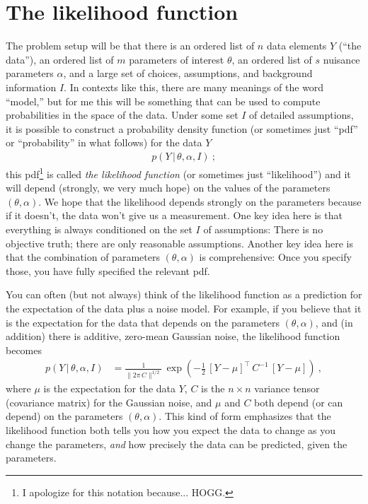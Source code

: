 \documentclass{article}
\newcommand{\given}{\,|\,}
\newcommand{\norm}[1]{\lVert{#1}\rVert}
\begin{document}
\section{The likelihood function}\label{sec:lf}
The problem setup will be that there is an ordered list of $n$ data elements $Y$ (``the data''), an ordered list of $m$ parameters of interest $\theta$, an ordered list of $s$ nuisance parameters $\alpha$, and a large set of choices, assumptions, and background information $I$.
In contexts like this, there are many meanings of the word ``model,'' but for me this will be something that can be used to compute probabilities in the space of the data.
Under some set $I$ of detailed assumptions, it is possible to construct a probability density function (or sometimes just ``pdf'' or ``probability'' in what follows) for the data $Y$
\begin{align}
    p(Y\given\theta,\alpha,I) ~;
\end{align}
this pdf\footnote{I apologize for this notation because... HOGG.} is called \emph{the likelihood function} (or sometimes just ``likelihood'') and it will depend (strongly, we very much hope) on the values of the parameters $(\theta, \alpha)$.
We hope that the likelihood depends strongly on the parameters because if it doesn't, the data won't give us a measurement.
One key idea here is that everything is always conditioned on the set $I$ of assumptions: There is no objective truth; there are only reasonable assumptions.
Another key idea here is that the combination of parameters $(\theta,\alpha)$ is comprehensive: Once you specify those, you have fully specified the relevant pdf.

You can often (but not always) think of the likelihood function as a prediction for the expectation of the data plus a noise model.
For example, if you believe that it is the expectation for the data that depends on the parameters $(\theta, \alpha)$, and (in addition) there is additive, zero-mean Gaussian noise, the likelihood function becomes
\begin{align}
    p(Y\given\theta,\alpha,I) &= \frac{1}{\norm{2\pi\,C}^{1/2}}\,\exp\left(-\frac{1}{2}\,[Y - \mu]^\top\,C^{-1}\,[Y - \mu]\right) ~,
\end{align}
where $\mu$ is the expectation for the data $Y$,
$C$ is the $n\times n$ variance tensor (covariance matrix) for the Gaussian noise,
and $\mu$ and $C$ both depend (or can depend) on the parameters $(\theta,\alpha)$.
This kind of form emphasizes that the likelihood function both tells you how you expect the data to change as you change the parameters, \emph{and} how precisely the data can be predicted, given the parameters.
\end{document}
